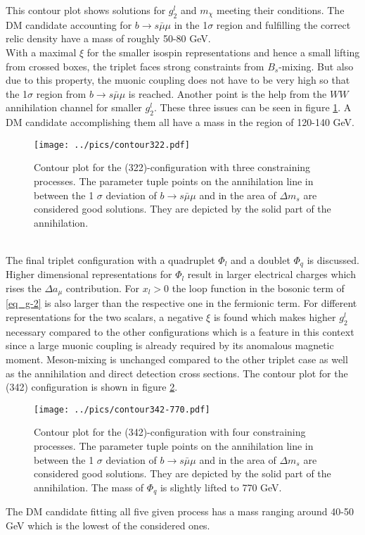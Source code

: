This contour plot shows solutions for $g_2^l$ and $m_\chi$ meeting their conditions. The DM candidate accounting for  
$b\rightarrow s\bar\mu\mu$ in the 1$\sigma$ region and fulfilling the correct relic density have a mass of roughly 50-80 GeV.\\
\noindent With a maximal $\xi$ for the smaller isospin representations and hence a small lifting from crossed boxes, the triplet faces strong
constraints from $B_s$-mixing. But also due to this property, the muonic coupling does not have to be very high so that the 1$\sigma$ region from
$b\rightarrow s\bar\mu\mu$ is reached. Another point is the help from the $WW$ annihilation channel for smaller $g_2^l$. These three issues can be
seen in figure \ref{pic_TriRes}. A DM candidate accomplishing them all have a mass in the region of 120-140 GeV.
\begin{figure}[t]
 \texttt{[image: ../pics/contour322.pdf]}
 \caption{Contour plot for the (322)-configuration with three constraining processes. The parameter tuple points on the annihilation line in between the 
 1 $\sigma$ deviation of $b\rightarrow s\bar\mu\mu$ and in the area of $\Delta m_s$ are considered good solutions. They are depicted by the solid
 part of the annihilation.}
 \label{pic_TriRes}
\end{figure}
\\
\noindent The final triplet configuration with a quadruplet $\Phi_l$ and a doublet $\Phi_q$ is discussed. Higher dimensional representations for 
$\Phi_l$ result in larger electrical charges which rises the $\Delta a_\mu$ contribution. For $x_l>0$ the loop function in the bosonic term of
\eqref{eq_g-2} is also larger than the respective one in the fermionic term. For different representations for the two scalars, a negative $\xi$
is found which makes higher $g_2^l$ necessary compared to the other configurations which is a feature in this context since a large muonic coupling
is already required by its anomalous magnetic moment. Meson-mixing is unchanged compared to the other triplet case as well as the annihilation 
and direct detection cross sections. The contour plot for the (342) configuration is shown in figure \ref{pic_Tri342Res}.
\begin{figure}[t]
 \texttt{[image: ../pics/contour342-770.pdf]}
 \caption{Contour plot for the (342)-configuration with four constraining processes. The parameter tuple points on the annihilation line in between 
 the 1 $\sigma$ deviation of $b\rightarrow s\bar\mu\mu$ and in the area of $\Delta m_s$ are considered good solutions. They are depicted by the solid
 part of the annihilation. The mass of $\Phi_q$ is slightly lifted to 770 GeV.}
 \label{pic_Tri342Res}
\end{figure}
The DM candidate fitting all five given process has a mass ranging around 40-50 GeV which is the lowest of the considered ones. 




